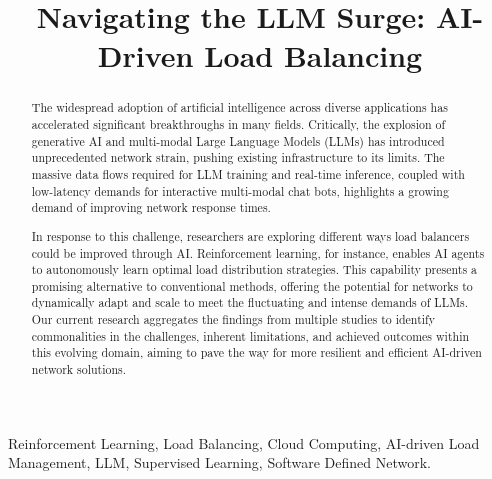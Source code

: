 \documentclass[conference]{IEEEtran}
\begin{document}
\title{Navigating the LLM Surge: AI-Driven Load Balancing}

\author{
\and
{}
}

\maketitle

\begin{abstract}
The widespread adoption of artificial intelligence across diverse applications has accelerated significant breakthroughs in many fields. Critically, the explosion of generative AI and multi-modal Large Language Models (LLMs) has introduced unprecedented network strain, pushing existing infrastructure to its limits. The massive data flows required for LLM training and real-time inference, coupled with low-latency demands for interactive multi-modal chat bots, highlights a growing demand of improving network response times.

In response to this challenge, researchers are exploring different ways load balancers could be improved through AI. Reinforcement learning, for instance, enables AI agents to autonomously learn optimal load distribution strategies. This capability presents a promising alternative to conventional methods, offering the potential for networks to dynamically adapt and scale to meet the fluctuating and intense demands of LLMs. Our current research aggregates the findings from multiple studies to identify commonalities in the challenges, inherent limitations, and achieved outcomes within this evolving domain, aiming to pave the way for more resilient and efficient AI-driven network solutions.
\end{abstract}

\begin{IEEEkeywords}
Reinforcement Learning, Load Balancing, Cloud Computing, AI-driven Load Management, LLM, Supervised Learning, Software Defined Network.
\end{IEEEkeywords}
\end{document}
